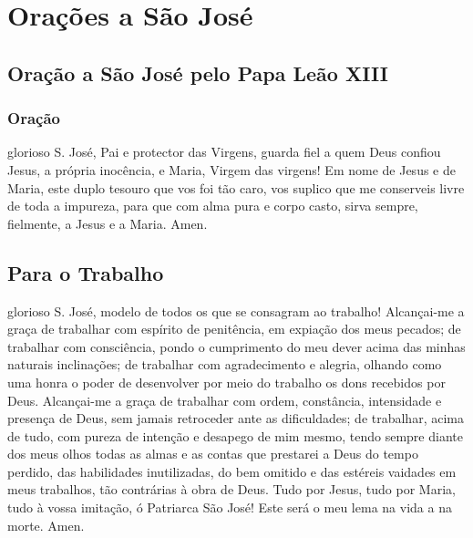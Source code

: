 \section{Orações a São José}\label{oracoessaojose}


\subsection{Oração a São José pelo Papa Leão XIII}\label{saojose}


\subsubsection{Oração}
 glorioso S. José, Pai e protector das Virgens, guarda fiel a quem Deus confiou Jesus, a própria inocência, e Maria, Virgem das virgens! Em nome de Jesus e de Maria, este duplo tesouro que vos foi tão caro, vos suplico que me conserveis livre de toda a impureza, para que com alma pura e corpo casto, sirva sempre, fielmente, a Jesus e a Maria. Amen.

\subsection{Para o Trabalho}
 glorioso S. José, modelo de todos os que se consagram ao trabalho! Alcançai-me a graça de trabalhar com espírito de penitência, em expiação dos meus pecados; de trabalhar com consciência, pondo o cumprimento do meu dever acima das minhas naturais inclinações; de trabalhar com agradecimento e alegria, olhando como uma honra o poder de desenvolver por meio do trabalho os dons recebidos por Deus. Alcançai-me a graça de trabalhar com ordem, constância, intensidade e presença de Deus, sem jamais retroceder ante as dificuldades; de trabalhar, acima de tudo, com pureza de intenção e desapego de mim mesmo, tendo sempre diante dos meus olhos todas as almas e as contas que prestarei a Deus do tempo perdido, das habilidades inutilizadas, do bem omitido e das estéreis vaidades em meus trabalhos, tão contrárias à obra de Deus. Tudo por Jesus, tudo por Maria, tudo à vossa imitação, ó Patriarca São José! Este será o meu lema na vida a na morte. Amen.
